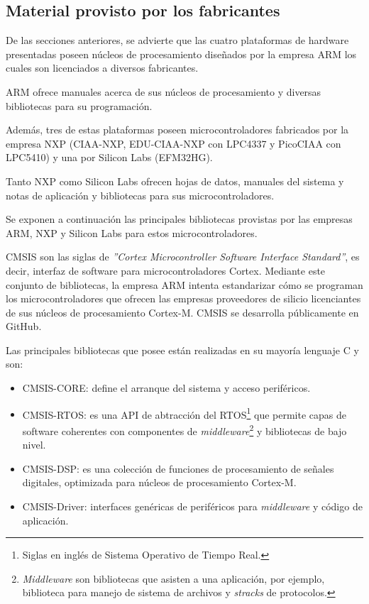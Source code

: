 \subsection{Material provisto por los fabricantes}

De las secciones anteriores, se advierte que las cuatro plataformas de hardware presentadas poseen núcleos de procesamiento diseñados por la empresa ARM \citep{ARM} los cuales son licenciados a diversos fabricantes.

ARM ofrece manuales acerca de sus núcleos de procesamiento y diversas bibliotecas para su programación.

Además, tres de estas plataformas poseen microcontroladores fabricados por la empresa NXP (CIAA-NXP, EDU-CIAA-NXP con LPC4337 y PicoCIAA con LPC5410) y una por Silicon Labs (EFM32HG). 

Tanto NXP como Silicon Labs ofrecen hojas de datos, manuales del sistema y notas de aplicación y bibliotecas para sus microcontroladores.

Se exponen a continuación las principales bibliotecas provistas por las empresas ARM, NXP y Silicon Labs para estos microcontroladores.


CMSIS \citep{CMSIS} son las siglas de \emph{''Cortex Microcontroller Software Interface Standard''}, es decir, interfaz de software para microcontroladores Cortex. Mediante este conjunto de bibliotecas, la empresa ARM intenta estandarizar cómo se programan los microcontroladores que ofrecen las empresas proveedores de silicio licenciantes de sus núcleos de procesamiento Cortex-M. CMSIS se desarrolla públicamente en GitHub. 

Las principales bibliotecas que posee están realizadas en su mayoría lenguaje C y son:

\begin{itemize}
\item
CMSIS-CORE: define el arranque del sistema y acceso periféricos.
\item
CMSIS-RTOS: es una API de abtracción del RTOS\footnote{Siglas en inglés de Sistema Operativo de Tiempo Real.} que permite capas de software coherentes con componentes de \emph{middleware}\footnote{\emph{Middleware} son bibliotecas que asisten a una aplicación, por ejemplo, biblioteca para manejo de sistema de archivos y \emph{stracks} de protocolos.} y bibliotecas de bajo nivel.
\item
CMSIS-DSP: es una colección de funciones de procesamiento de señales digitales, optimizada para núcleos de procesamiento Cortex-M.
\item
CMSIS-Driver: interfaces genéricas de periféricos para \emph{middleware} y código de aplicación.
\end{itemize}

